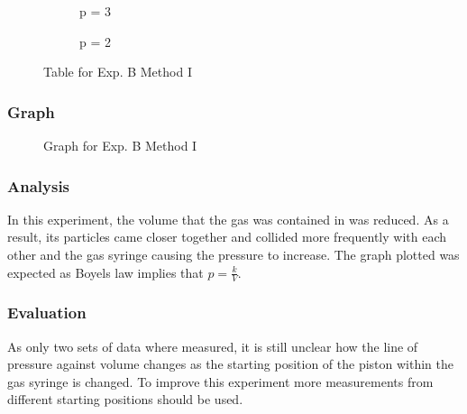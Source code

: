 \begin{figure*}[H]
  \begin{subfigure}{0.5\linewidth}
    \centering
    \caption{p = 3}
  \end{subfigure}
  \hfill
  \begin{subfigure}{0.5\linewidth}
    \centering
    \caption{p = 2}
  \end{subfigure}
  \caption{Table for Exp. B Method I}
\end{figure*}

\subsubsection{Graph}
\begin{figure}[H]
  \centering
  \caption{Graph for Exp. B Method I}
\end{figure}

\subsubsection{Analysis}
In this experiment, the volume that the gas was contained in was reduced. As a result, its particles came closer together and collided more frequently with each other and the gas syringe causing the pressure to increase.
The graph plotted was expected as Boyels law implies that $p=\frac{k}{V}$.
\subsubsection{Evaluation}
As only two sets of data where measured, it is still unclear how the line of pressure against volume changes as the starting position of the piston within the gas syringe is changed.
To improve this experiment more measurements from different starting positions should be used.

